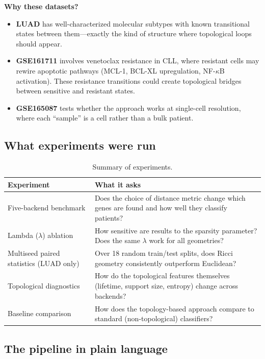 \documentclass[11pt]{article}
\begin{document}
\textbf{Why these datasets?}
\begin{itemize}[leftmargin=1.5em]
    \item \textbf{LUAD} has well-characterized molecular subtypes with known transitional states between them---exactly the kind of structure where topological loops should appear.
    \item \textbf{GSE161711} involves venetoclax resistance in CLL, where resistant cells may rewire apoptotic pathways (MCL-1, BCL-XL upregulation, NF-$\kappa$B activation). These resistance transitions could create topological bridges between sensitive and resistant states.
    \item \textbf{GSE165087} tests whether the approach works at single-cell resolution, where each ``sample'' is a cell rather than a bulk patient.
\end{itemize}

\subsection{What experiments were run}

\begin{table}[h]
\centering
\small
\begin{tabular}{p{3.5cm}p{8.5cm}}
\toprule
\textbf{Experiment} & \textbf{What it asks} \\
\midrule
Five-backend benchmark & Does the choice of distance metric change which genes are found and how well they classify patients? \\
\midrule
Lambda ($\lambda$) ablation & How sensitive are results to the sparsity parameter? Does the same $\lambda$ work for all geometries? \\
\midrule
Multiseed paired statistics (LUAD only) & Over 18 random train/test splits, does Ricci geometry consistently outperform Euclidean? \\
\midrule
Topological diagnostics & How do the topological features themselves (lifetime, support size, entropy) change across backends? \\
\midrule
Baseline comparison & How does the topology-based approach compare to standard (non-topological) classifiers? \\
\bottomrule
\end{tabular}
\caption{Summary of experiments.}
\end{table}

\subsection{The pipeline in plain language}
\end{document}
